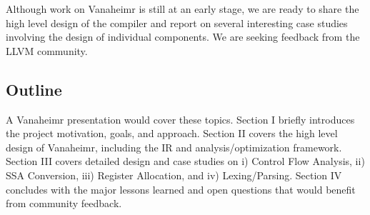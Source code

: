 \documentclass[conference, 10pt]{IEEEtran}
\begin{document}
Although work on Vanaheimr is still at an early stage, we are ready to share
the high level design of the compiler and report on several interesting case
studies involving the design of individual components.  We are seeking
feedback from the LLVM community.


\subsection{Outline}

A Vanaheimr presentation would cover these topics. Section I briefly introduces
the project motivation, goals, and approach.
Section II covers the high level design of Vanaheimr, including the IR and
analysis/optimization framework.  Section III covers detailed design and case
studies on i) Control Flow Analysis, ii) SSA Conversion, iii) Register
Allocation, and iv) Lexing/Parsing.  Section IV concludes with the major lessons
learned and open questions that would benefit from community feedback.



\end{document}

